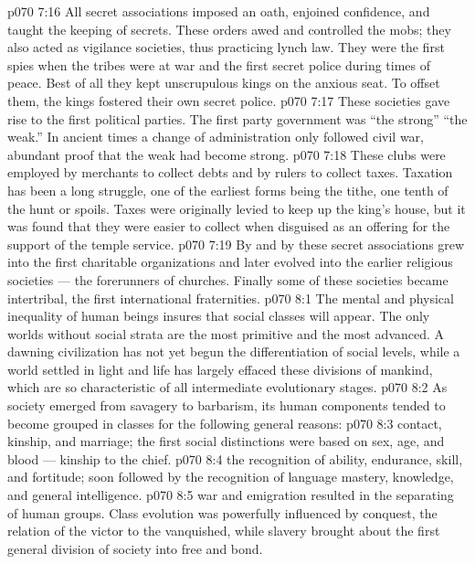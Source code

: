 \vs p070 7:16 All secret associations imposed an oath, enjoined confidence, and taught the keeping of secrets. These orders awed and controlled the mobs; they also acted as vigilance societies, thus practicing lynch law. They were the first spies when the tribes were at war and the first secret police during times of peace. Best of all they kept unscrupulous kings on the anxious seat. To offset them, the kings fostered their own secret police.
\vs p070 7:17 These societies gave rise to the first political parties. The first party government was “the strong”  “the weak.” In ancient times a change of administration only followed civil war, abundant proof that the weak had become strong.
\vs p070 7:18 These clubs were employed by merchants to collect debts and by rulers to collect taxes. Taxation has been a long struggle, one of the earliest forms being the tithe, one tenth of the hunt or spoils. Taxes were originally levied to keep up the king’s house, but it was found that they were easier to collect when disguised as an offering for the support of the temple service.
\vs p070 7:19 By and by these secret associations grew into the first charitable organizations and later evolved into the earlier religious societies --- the forerunners of churches. Finally some of these societies became intertribal, the first international fraternities.
\vs p070 8:1 The mental and physical inequality of human beings insures that social classes will appear. The only worlds without social strata are the most primitive and the most advanced. A dawning civilization has not yet begun the differentiation of social levels, while a world settled in light and life has largely effaced these divisions of mankind, which are so characteristic of all intermediate evolutionary stages.
\vs p070 8:2 As society emerged from savagery to barbarism, its human components tended to become grouped in classes for the following general reasons:
\vs p070 8:3 \bibnobreakspace {} contact, kinship, and marriage; the first social distinctions were based on sex, age, and blood --- kinship to the chief.
\vs p070 8:4 \pc {}\bibnobreakspace {} the recognition of ability, endurance, skill, and fortitude; soon followed by the recognition of language mastery, knowledge, and general intelligence.
\vs p070 8:5 \pc {}\bibnobreakspace {} war and emigration resulted in the separating of human groups. Class evolution was powerfully influenced by conquest, the relation of the victor to the vanquished, while slavery brought about the first general division of society into free and bond.
